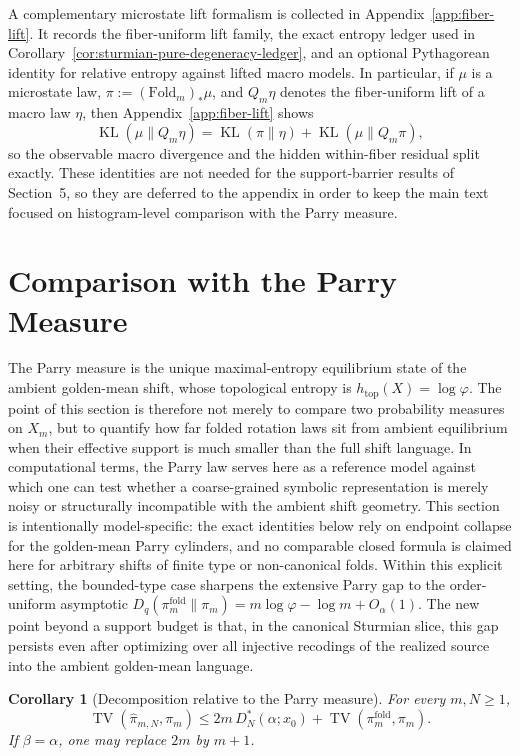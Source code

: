 \documentclass[11pt,letterpaper]{article}
\numberwithin{equation}{section}
\theoremstyle{plain}
\newtheorem{corollary}[theorem]{Corollary}
\theoremstyle{definition}
\theoremstyle{remark}
\newcommand{\Fold}{\mathrm{Fold}}
\DeclareMathOperator{\TV}{TV}
\DeclareMathOperator{\KL}{KL}
\begin{document}
A complementary microstate lift formalism is collected in
Appendix~\ref{app:fiber-lift}. It records the fiber-uniform lift family, the
exact entropy ledger used in Corollary~\ref{cor:sturmian-pure-degeneracy-ledger},
and an optional Pythagorean identity for relative entropy against lifted macro
models. In particular, if \(\mu\) is a microstate law, \(\pi:=(\Fold_m)_*\mu\),
and \(Q_m\eta\) denotes the fiber-uniform lift of a macro law \(\eta\), then
Appendix~\ref{app:fiber-lift} shows
\[
\KL(\mu\|Q_m\eta)=\KL(\pi\|\eta)+\KL(\mu\|Q_m\pi),
\]
so the observable macro divergence and the hidden within-fiber residual split
exactly. These identities are not needed for the support-barrier results of
Section~5, so they are deferred to the appendix in order to keep the main text
focused on histogram-level comparison with the Parry measure.

\section{Comparison with the Parry Measure}

The Parry measure is the unique maximal-entropy equilibrium state of the
ambient golden-mean shift, whose topological entropy is
\(h_{\mathrm{top}}(X)=\log\varphi\). The point of this section is therefore not
merely to compare two probability measures on \(X_m\), but to quantify how far
folded rotation laws sit from ambient equilibrium when their effective support
is much smaller than the full shift language. In computational terms, the Parry
law serves here as a reference model against which one can test whether a
coarse-grained symbolic representation is merely noisy or structurally
incompatible with the ambient shift geometry. This section is intentionally
model-specific: the exact identities below rely on endpoint collapse for the
golden-mean Parry cylinders, and no comparable closed formula is claimed here
for arbitrary shifts of finite type or non-canonical folds. Within this explicit
setting, the bounded-type case sharpens the extensive Parry gap to the
order-uniform asymptotic
\(D_q(\pi_m^{\mathrm{fold}}\|\pi_m)=m\log\varphi-\log m+O_\alpha(1)\). The new
point beyond a support budget is that, in the canonical Sturmian slice, this
gap persists even after optimizing over all injective recodings of the realized
source into the ambient golden-mean language.

\begin{corollary}[Decomposition relative to the Parry measure]\label{cor:tv-decomposition-parry}
For every $m,N\ge 1$,
\[
\TV(\hat\pi_{m,N},\pi_m)
\le
2m\,D_N^*(\alpha;x_0)+\TV(\pi_m^{\mathrm{fold}},\pi_m).
\]
If \(\beta=\alpha\), one may replace \(2m\) by \(m+1\).
\end{corollary}
\end{document}
